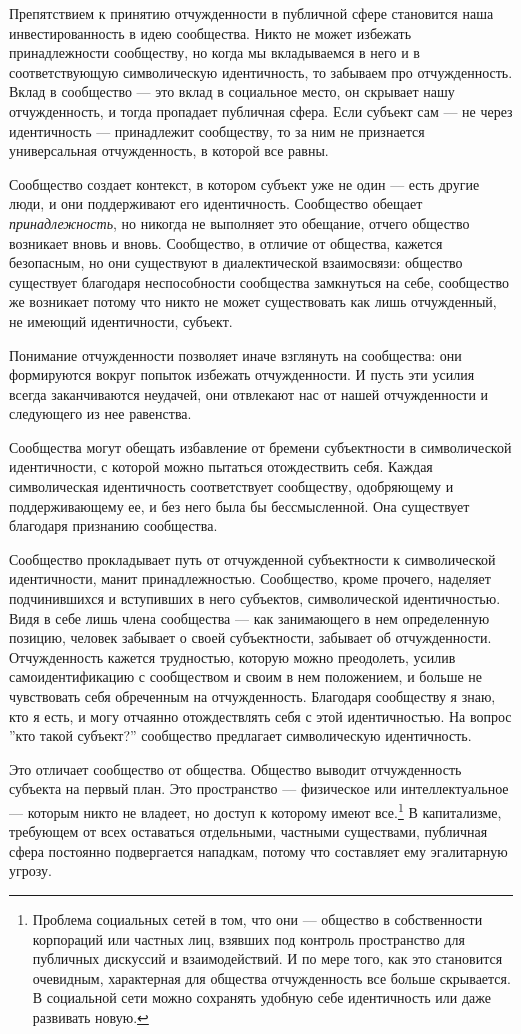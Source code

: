 \documentclass[12pt]{book}
\begin{document}
Препятствием к принятию отчужденности в публичной сфере становится наша инвестированность в идею сообщества. Никто не может избежать принадлежности сообществу, но когда мы вкладываемся в него и в соответствующую символическую идентичность, то забываем про отчужденность. Вклад в сообщество --- это вклад в социальное место, он скрывает нашу отчужденность, и тогда пропадает публичная сфера. Если субъект сам --- не через идентичность --- принадлежит сообществу, то за ним не признается универсальная отчужденность, в которой все равны.

Сообщество создает контекст, в котором субъект уже не один --- есть другие люди, и они поддерживают его идентичность. Сообщество обещает \textit{принадлежность}, но никогда не выполняет это обещание, отчего общество возникает вновь и вновь. Сообщество, в отличие от общества, кажется безопасным, но они существуют в диалектической взаимосвязи: общество существует благодаря неспособности сообщества замкнуться на себе, сообщество же возникает потому что никто не может существовать как лишь отчужденный, не имеющий идентичности, субъект.

Понимание отчужденности позволяет иначе взглянуть на сообщества: они формируются вокруг попыток избежать отчужденности. И пусть эти усилия всегда заканчиваются неудачей, они отвлекают нас от нашей отчужденности и следующего из нее равенства.

Сообщества могут обещать избавление от бремени субъектности в символической идентичности, с которой можно пытаться отождествить себя. Каждая символическая идентичность соответствует сообществу, одобряющему и поддерживающему ее, и без него была бы бессмысленной. Она существует благодаря признанию сообщества.

Сообщество прокладывает путь от отчужденной субъектности к символической идентичности, манит принадлежностью. Сообщество, кроме прочего, наделяет подчинившихся и вступивших в него субъектов, символической идентичностью. Видя в себе лишь члена сообщества --- как занимающего в нем определенную позицию, человек забывает о своей субъектности, забывает об отчужденности. Отчужденность кажется трудностью, которую можно преодолеть, усилив самоидентификацию с сообществом и своим в нем положением, и больше не чувствовать себя обреченным на отчужденность. Благодаря сообществу я знаю, кто я есть, и могу отчаянно отождествлять себя с этой идентичностью. На вопрос ''кто такой субъект?'' сообщество предлагает символическую идентичность.

Это отличает сообщество от общества. Общество выводит отчужденность субъекта на первый план. Это пространство --- физическое или интеллектуальное --- которым никто не владеет, но доступ к которому имеют все.\footnote{Проблема социальных сетей в том, что они --- общество в собственности корпораций или частных лиц, взявших под контроль пространство для публичных дискуссий и взаимодействий. И по мере того, как это становится очевидным, характерная для общества отчужденность все больше скрывается. В социальной сети можно сохранять удобную себе идентичность или даже развивать новую.} В капитализме, требующем от всех оставаться отдельными, частными существами, публичная сфера постоянно подвергается нападкам, потому что составляет ему эгалитарную угрозу.
\end{document}
